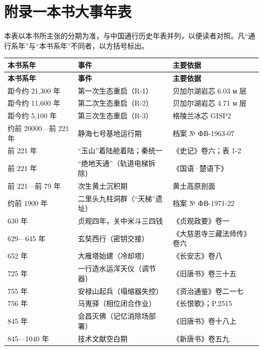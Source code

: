 \chapter*{附录一\quad 本书大事年表}

\noindent
本表以本书所主张的分期为准，与中国通行历史年表并列，以便读者对照。凡“通行系年”与“本书系年”不同者，以方括号标出。

\enlargethispage{14\baselineskip}
\vspace{2mm}
{\footnotesize
\renewcommand{\arraystretch}{1.22}
\begin{longtable}{@{}p{31mm}p{55mm}p{45mm}@{}}
\toprule
\textbf{本书系年} & \textbf{事件} & \textbf{主要依据}\\
\midrule
\endfirsthead
\toprule
\textbf{本书系年} & \textbf{事件} & \textbf{主要依据}\\
\midrule
\endhead
\bottomrule
\endfoot
距今约 21{,}300 年 & 第一次生态重启（R-1） & 贝加尔湖岩芯 6.03 м 层\\
距今约 11{,}600 年 & 第二次生态重启（R-2） & 贝加尔湖岩芯 4.71 м 层\\
距今约 5{,}100 年 & 第三次生态重启（R-3） & 格陵兰冰芯 GISP2\\
约前 20000—前 221 年 & 静海七号基地运行期 & 档案 № ФВ-1963-07\\
前 221 年 & “玉山”着陆舱着陆；秦统一 & 《史记》卷六；表 1-2\\
前 221 年 & “绝地天通”（轨道电梯拆除） & 《国语·楚语下》\\
前 221—前 79 年 & 次生黄土沉积期 & 黄土高原剖面\\
约前 1900 年 & 二里头九柱洞群（“天梯”遗址） & 档案 № ФВ-1971-22\\
630 年 & 贞观四年，关中米斗三四钱 & 《贞观政要》卷一\\
629—645 年 & 玄奘西行（密钥交接） & 《大慈恩寺三藏法师传》卷六\\
652 年 & 大雁塔始建（冷却塔） & 《长安志》卷八\\
725 年 & 一行造水运浑天仪（调节器） & 《旧唐书》卷三十五\\
755 年 & 安禄山起兵（塌缩器失控） & 《资治通鉴》卷二一七\\
756 年 & 马嵬驿（相位闭合作业） & 《长恨歌》；P.2515\\
845 年 & 会昌灭佛（记忆消除场部署） & 《旧唐书》卷十八上\\
845—1040 年 & 技术文献空白期 & 《新唐书》卷五九\\

\end{longtable}}
